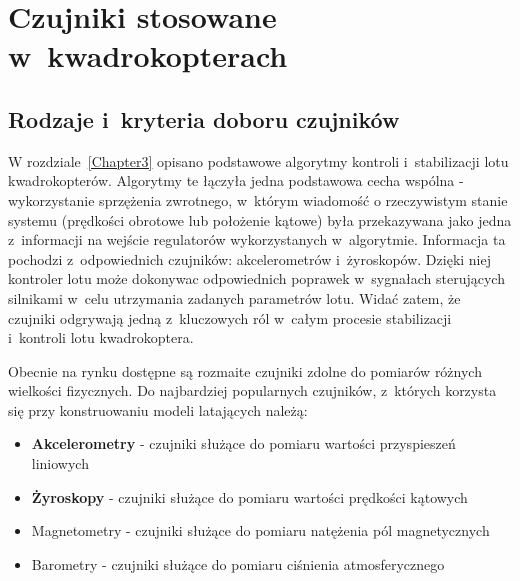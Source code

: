 
\chapter{Czujniki stosowane w~kwadrokopterach} %

\label{Chapter4} %


\section{Rodzaje i~kryteria doboru czujników}

W rozdziale~\ref{Chapter3} opisano podstawowe algorytmy kontroli i~stabilizacji lotu kwadrokopterów. Algorytmy te łączyła jedna podstawowa cecha wspólna - wykorzystanie sprzężenia zwrotnego, w~którym wiadomość o rzeczywistym stanie systemu (prędkości obrotowe lub położenie kątowe) była przekazywana jako jedna z~informacji na wejście regulatorów wykorzystanych w~algorytmie. Informacja ta pochodzi z~odpowiednich czujników: akcelerometrów i~żyroskopów. Dzięki niej kontroler lotu może dokonywac odpowiednich poprawek w~sygnałach sterujących silnikami w~celu utrzymania zadanych parametrów lotu. Widać zatem, że czujniki odgrywają jedną z~kluczowych ról w~całym procesie stabilizacji i~kontroli lotu kwadrokoptera. 

Obecnie na rynku dostępne są rozmaite czujniki zdolne do pomiarów różnych wielkości fizycznych. Do najbardziej popularnych czujników, z~których korzysta się przy konstruowaniu modeli latających należą:

\begin{itemize}
	\item \textbf{Akcelerometry} - czujniki służące do pomiaru wartości przyspieszeń liniowych
	\item \textbf{Żyroskopy} - czujniki służące do pomiaru wartości prędkości kątowych
	\item Magnetometry - czujniki służące do pomiaru natężenia pól magnetycznych
	\item Barometry - czujniki służące do pomiaru ciśnienia atmosferycznego
\end{itemize}

